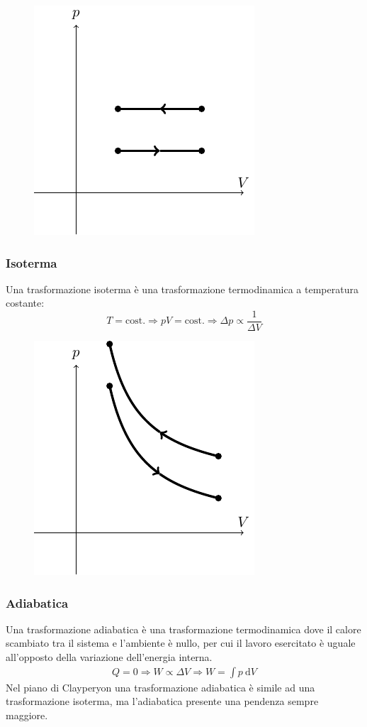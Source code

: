 \documentclass{article}
\newcommand{\df}{\mathrm{d}}
\numberwithin{equation}{subsection}
\begin{document}
\begin{figure}[H]%
    \centering
    \includegraphics{isobara.pdf}%
\end{figure}

\subsubsection{Isoterma}
Una trasformazione isoterma è una trasformazione termodinamica 
a temperatura costante:
\begin{equation*}
    T=\mathrm{cost.}\Rightarrow pV=\mathrm{cost.}\Rightarrow\Delta p\propto\displaystyle\frac{1}{\Delta V}
\end{equation*}

\begin{figure}[H]%
    \centering
    \includegraphics{isoterma.pdf}%
\end{figure}

\subsubsection{Adiabatica}
Una trasformazione adiabatica è una trasformazione termodinamica 
dove il calore scambiato tra il sistema e l'ambiente è nullo, 
per cui il lavoro esercitato è uguale all'opposto della variazione 
dell'energia interna.
\begin{gather*}
    Q=0\Rightarrow W\propto\Delta V\Rightarrow W=\int p\:\df V
\end{gather*}
Nel piano di Clayperyon una trasformazione adiabatica è 
simile ad una trasformazione isoterma, ma l'adiabatica presente 
una pendenza sempre maggiore.
\end{document}
